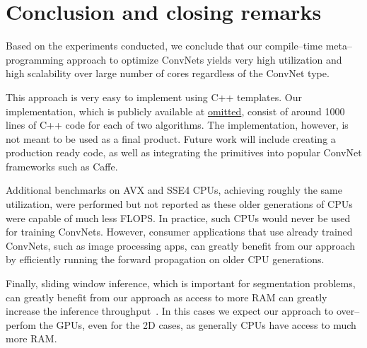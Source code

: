 \section{Conclusion and closing remarks}

  Based on the experiments conducted, we conclude that our
  compile--time meta--programming approach to optimize ConvNets yields
  very high utilization and high scalability over large number of
  cores regardless of the ConvNet type.

  This approach is very easy to implement using C++ templates.  Our
  implementation, which is publicly available at
  \url{omitted}, consist of around
  1000 lines of C++ code for each of two algorithms.  The
  implementation, however, is not meant to be used as a final product.
  Future work will include creating a production ready code, as well
  as integrating the primitives into popular ConvNet frameworks such
  as Caffe.

  Additional benchmarks on AVX and SSE4 CPUs, achieving roughly the
  same utilization, were performed but not reported as these older
  generations of CPUs were capable of much less FLOPS.  In practice,
  such CPUs would never be used for training ConvNets.  However,
  consumer applications that use already trained ConvNets, such as
  image processing apps, can greatly benefit from our approach by
  efficiently running the forward propagation on older CPU
  generations.

  Finally, sliding window inference, which is important for
  segmentation problems, can greatly benefit from our approach as
  access to more RAM can greatly increase the inference
  throughput~\cite{zlateski2016znni}.  In this cases we expect our
  approach to over--perfom the GPUs, even for the 2D cases, as
  generally CPUs have access to much more RAM.
